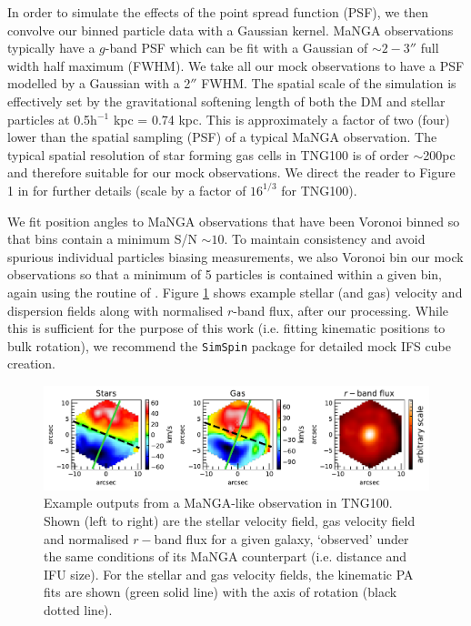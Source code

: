 In order to simulate the effects of the point spread function (PSF), we then convolve our binned particle data with a Gaussian kernel. MaNGA observations typically have a $g$-band PSF which can be fit with a Gaussian of $\sim 2-3''$ full width half maximum (FWHM). We take all our mock observations to have a PSF modelled by a Gaussian with a 2$''$ FWHM. The spatial scale of the simulation is effectively set by the gravitational softening length of both the DM and stellar particles at 0.5h$^{-1}$ kpc = 0.74 kpc. This is approximately a factor of two (four) lower than the spatial sampling (PSF) of a typical MaNGA observation. The typical spatial resolution of star forming gas cells in TNG100 is of order $\sim$200pc and therefore suitable for our mock observations. We direct the reader to Figure 1 in \citet{pillepich2019} for further details (scale by a factor of $16^{1/3}$ for TNG100).

We fit position angles to MaNGA observations that have been Voronoi binned so that bins contain a minimum S/N $\sim 10$. To maintain consistency and avoid spurious individual particles biasing measurements, we also Voronoi bin our mock observations so that a minimum of 5 particles is contained within a given bin, again using the routine of \citet{cappellari2003}. Figure \ref{fig:example_obs} shows example stellar (and gas) velocity and dispersion fields along with normalised $r$-band flux, after our processing. While this is sufficient for the purpose of this work (i.e. fitting kinematic positions to bulk rotation), we recommend the \texttt{SimSpin} package \citep{harborne2019, harborne2020} for detailed mock IFS cube creation.

\begin{figure}
	\includegraphics[width=\linewidth]{misalignment_TNG/example_kinematics.pdf}
    \caption{Example outputs from a MaNGA-like observation in TNG100. Shown (left to right) are the stellar velocity field, gas velocity field and normalised $r-$band flux for a given galaxy, `observed' under the same conditions of its MaNGA counterpart (i.e. distance and IFU size). For the stellar and gas velocity fields, the kinematic PA fits are shown (green solid line) with the axis of rotation (black dotted line).}
    \label{fig:example_obs}
\end{figure}

